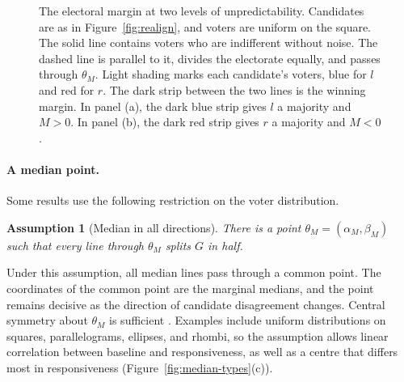 \documentclass[12pt,letterpaper]{article}
\newtheorem{assumption}{Assumption}
\begin{document}
\begin{figure}[tbp]
\begin{minipage}[b]{0.49\linewidth}
\end{minipage}
\caption{The electoral margin at two levels of unpredictability. Candidates are as in Figure~\ref{fig:realign}, and voters are uniform on the square. The solid line contains voters who are indifferent without noise. The dashed line is parallel to it, divides the electorate equally, and passes through $\theta_M$. Light shading marks each candidate's voters, blue for $l$ and red for $r$. The dark strip between the two lines is the winning margin. In panel (a), the dark blue strip gives $l$ a majority and $M>0$. In panel (b), the dark red strip gives $r$ a majority and $M<0$.}
\label{fig:median}
\end{figure}

\paragraph{A median point.}
Some results use the following restriction on the voter distribution.

\begin{assumption}[Median in all directions]\label{ass:median}
There is a point $\theta_M=(\alpha_M,\beta_M)$ such that every line through $\theta_M$ splits $G$ in half.
\end{assumption}

Under this assumption, all median lines pass through a common point. The coordinates of the common point are the marginal medians, and the point remains decisive as the direction of candidate disagreement changes. Central symmetry about $\theta_M$ is sufficient \citep{DavisDeGrootHinich1972}. Examples include uniform distributions on squares, parallelograms, ellipses, and rhombi, so the assumption allows linear correlation between baseline and responsiveness, as well as a centre that differs most in responsiveness (Figure~\ref{fig:median-types}(c)).
\end{document}
